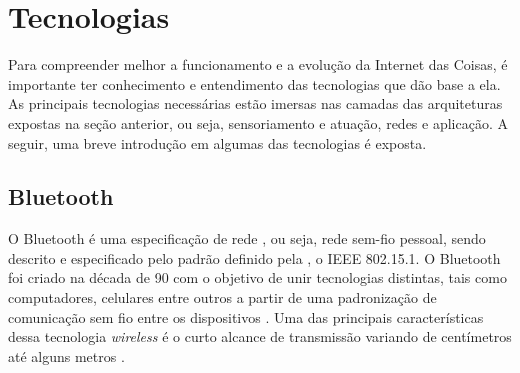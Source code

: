 

\section{Tecnologias}




Para compreender melhor a funcionamento e a evolução da Internet das Coisas, é importante ter conhecimento e entendimento das tecnologias que dão base a ela. As principais tecnologias necessárias estão imersas nas camadas das arquiteturas expostas na seção anterior, ou seja, sensoriamento e atuação, redes e aplicação. A seguir, uma breve introdução em algumas das tecnologias é exposta.

\subsection{Bluetooth}

O Bluetooth é uma especificação de rede  , ou seja, rede sem-fio pessoal, sendo descrito e especificado pelo padrão definido pela  , o IEEE 802.15.1. O Bluetooth foi criado na década de 90 com o objetivo de unir tecnologias distintas, tais como computadores, celulares entre outros a partir de uma padronização de comunicação sem fio entre os dispositivos \cite{Kardach2008}. 
Uma das principais características dessa tecnologia \textit{wireless} é o curto alcance de transmissão variando de centímetros até alguns metros \cite{Huang2007}. 


